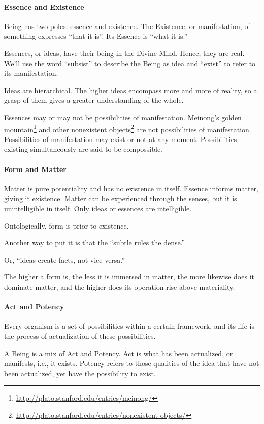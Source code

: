 \paragraph{Essence and Existence}
Being has two poles: essence and existence. The Existence, or manifestation, of something expresses “that it is”. Its Essence is “what it is.”

Essences, or ideas, have their being in the Divine Mind. Hence, they are real. We'll use the word “subsist” to describe the Being as idea and “exist” to refer to its manifestation.

Ideas are hierarchical. The higher ideas encompass more and more of reality, so a grasp of them gives a greater understanding of the whole.

Essences may or may not be possibilities of manifestation. Meinong's golden mountain\footnote{\url{http://plato.stanford.edu/entries/meinong/}} and other nonexistent objects\footnote{\url{http://plato.stanford.edu/entries/nonexistent-objects/}} are not possibilities of manifestation. Possibilities of manifestation may exist or not at any moment. Possibilities existing simultaneously are said to be compossible.

\paragraph{Form and Matter}
Matter is pure potentiality and has no existence in itself. Essence informs matter, giving it existence. Matter can be experienced through the senses, but it is unintelligible in itself. Only ideas or essences are intelligible.

Ontologically, form is prior to existence.

Another way to put it is that the “subtle rules the dense.”

Or, “ideas create facts, not vice versa.”

\begin{quotex}
The higher a form is, the less it is immersed in matter, the more likewise does it dominate matter, and the higher does its operation rise above materiality. 

\end{quotex}
\paragraph{Act and Potency}
\begin{quotex}
Every organism is a set of possibilities within a certain framework, and its life is the process of actualization of these possibilities.  

\end{quotex}
A Being is a mix of Act and Potency. Act is what has been actualized, or manifests, i.e., it exists. Potency refers to those qualities of the idea that have not been actualized, yet have the possibility to exist.

